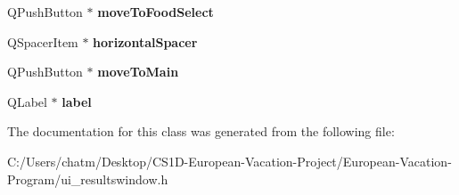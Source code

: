 \begin{DoxyCompactItemize}
Q\+Push\+Button $\ast$ {\bfseries move\+To\+Food\+Select}
\item 
\mbox{\label{class_ui___results_window_a421594e26775e4a6e1a78cd9b6e76e5c}} 
Q\+Spacer\+Item $\ast$ {\bfseries horizontal\+Spacer}
\item 
\mbox{\label{class_ui___results_window_add81048cb44e1272a8db13bba6526026}} 
Q\+Push\+Button $\ast$ {\bfseries move\+To\+Main}
\item 
\mbox{\label{class_ui___results_window_a92b47852b0a7ef14cbfce0b9c2a42142}} 
Q\+Label $\ast$ {\bfseries label}
\end{DoxyCompactItemize}


The documentation for this class was generated from the following file\+:\begin{DoxyCompactItemize}
\item 
C\+:/\+Users/chatm/\+Desktop/\+C\+S1\+D-\/\+European-\/\+Vacation-\/\+Project/\+European-\/\+Vacation-\/\+Program/ui\+\_\+resultswindow.\+h\end{DoxyCompactItemize}

